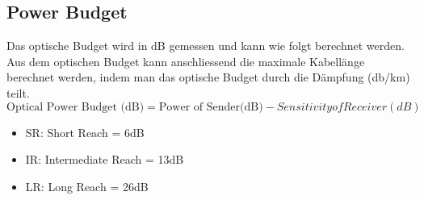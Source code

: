 \subsection{Power Budget}
Das optische Budget wird in dB gemessen und kann wie folgt berechnet werden. Aus dem optischen Budget kann anschliessend die maximale Kabellänge berechnet werden, indem man das optische Budget durch die Dämpfung (db/km) teilt.
\[
	\text{Optical Power Budget (dB)} = \text{Power of Sender(dB)} - {Sensitivity of Receiver(dB)}
\]
\begin{itemize}[label=]
	\item SR: Short Reach = 6dB
	\item IR: Intermediate Reach = 13dB
	\item LR: Long Reach = 26dB
\end{itemize}

